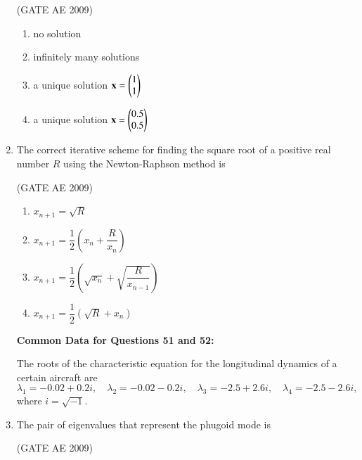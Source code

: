 \documentclass[journal,12pt,onecolumn]{IEEEtran}
\theoremstyle{remark}
\begin{document}
\begin{flushleft}
\begin{enumerate}
\hfill(GATE AE 2009)

\begin{enumerate}
\item no solution
\item infinitely many solutions
\item a unique solution $\mathbf{x} = \begin{pmatrix}1 \\ 1\end{pmatrix}$
\item a unique solution $\mathbf{x} = \begin{pmatrix}0.5 \\ 0.5\end{pmatrix}$
\end{enumerate}

\item The correct iterative scheme for finding the square root of a positive real number $R$ using the Newton-Raphson method is

\hfill(GATE AE 2009)

\begin{enumerate}
\item $x_{n+1} = \sqrt{R}$
\item $x_{n+1} = \dfrac{1}{2} \left( x_n + \dfrac{R}{x_n} \right)$
\item $x_{n+1} = \dfrac{1}{2} \left( \sqrt{x_n} + \sqrt{\dfrac{R}{x_{n-1}}} \right)$
\item $x_{n+1} = \dfrac{1}{2} \left( \sqrt{R} + x_n \right)$
\end{enumerate}
\textbf{Common Data for Questions 51 and 52:}

The roots of the characteristic equation for the longitudinal dynamics of a certain aircraft are
\[
\lambda_1 = -0.02 + 0.2i, \quad \lambda_2 = -0.02 - 0.2i, \quad \lambda_3 = -2.5 + 2.6i, \quad \lambda_4 = -2.5 - 2.6i,
\]
where \(i = \sqrt{-1}\).

\item The pair of eigenvalues that represent the phugoid mode is

\hfill(GATE AE 2009)

\begin{enumerate}

\end{enumerate}


\end{enumerate}
\end{flushleft}
\end{document}

